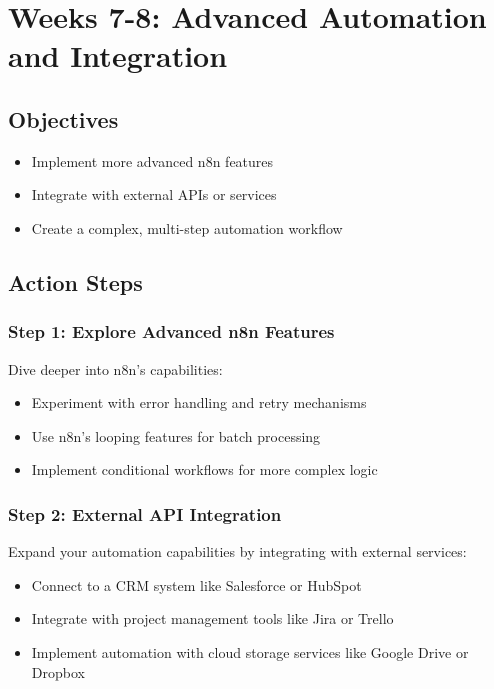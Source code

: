 \section{Weeks 7-8: Advanced Automation and Integration}

\subsection{Objectives}
\begin{itemize}
    \item Implement more advanced n8n features
    \item Integrate with external APIs or services
    \item Create a complex, multi-step automation workflow
\end{itemize}

\subsection{Action Steps}

\subsubsection{Step 1: Explore Advanced n8n Features}
Dive deeper into n8n's capabilities:

\begin{itemize}
    \item Experiment with error handling and retry mechanisms
    \item Use n8n's looping features for batch processing
    \item Implement conditional workflows for more complex logic
\end{itemize}

\subsubsection{Step 2: External API Integration}
Expand your automation capabilities by integrating with external services:

\begin{itemize}
    \item Connect to a CRM system like Salesforce or HubSpot
    \item Integrate with project management tools like Jira or Trello
    \item Implement automation with cloud storage services like Google Drive or Dropbox
\end{itemize}

